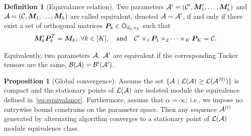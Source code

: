 \documentclass[12pt]{article}
\theoremstyle{definition}
\newtheorem{prop}{Proposition}
\theoremstyle{definition}
\newtheorem{defn}{Definition}
\begin{document}
\begin{defn}[Equivalance relation]\label{eq:equivalance}
Two parameters $\mathcal{A}'=(\mathcal{C}', \bm M'_1,\ldots,\bm M'_k)$ and $\mathcal{A}=(\mathcal{C}, \bm M_1,\ldots,\bm M_k)$ are called equivalent, denoted $\mathcal{A}\sim \mathcal{A}'$, if and only if there exist a set of orthogonal matrices $\bm{P}_k \in \mathbb{O}_{d_k,r_k}$ such that
\begin{align}
	\bm M'_k \bm{P}^T_k = \bm M_k ,\ \forall k \in [K], \quad \text{and}\quad \mathcal{C}' \times_1 \bm{P}_1 \times_2  \dots \times_K \bm{P}_K = \mathcal{C}.
\end{align}
\end{defn}
Equivalently, two parameters $\tA,\ \tA'$ are equivalent if the corresponding Tucker tensors are the same, $\mathcal{B}(\mathcal{A})=\mathcal{B}'(\mathcal{A}')$. 

\begin{prop}[Global convergence]
Assume the set $\{\mathcal{A}\ |\ \mathcal{L}(\mathcal{A}) \geq \mathcal{L}(\mathcal{A}^{(0)}) \}$ is compact and the stationary points of $\mathcal{L}(\mathcal{A})$ are isolated module the equivalence defined in~\eqref{eq:equivalance}. Furthermore, assume that $\alpha = \infty$; i.e., we impose no entrywise bound constrains on the parameter space. Then any sequence $\mathcal{A}^{(t)}$ generated by alternating algorithm converges to a stationary point of $\mathcal{L}(\mathcal{A})$ module equivalence class.
\end{prop}
\end{document}
